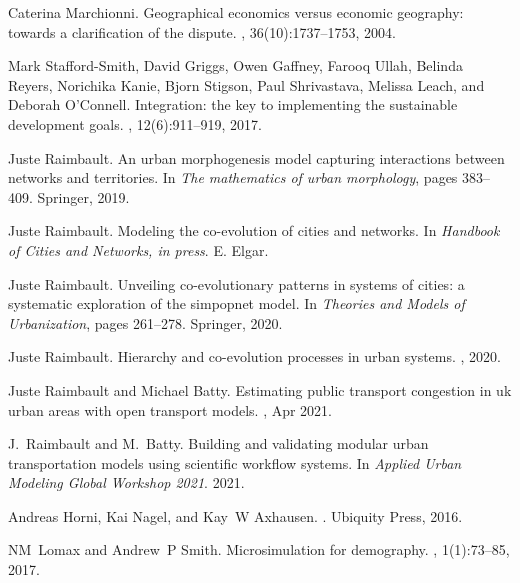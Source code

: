 \begin{thebibliography}{10}
Caterina Marchionni.
\newblock Geographical economics versus economic geography: towards a
  clarification of the dispute.
, 36(10):1737--1753, 2004.

Mark Stafford-Smith, David Griggs, Owen Gaffney, Farooq Ullah, Belinda Reyers,
  Norichika Kanie, Bjorn Stigson, Paul Shrivastava, Melissa Leach, and Deborah
  O’Connell.
\newblock Integration: the key to implementing the sustainable development
  goals.
, 12(6):911--919, 2017.

Juste Raimbault.
\newblock An urban morphogenesis model capturing interactions between networks
  and territories.
\newblock In {\em The mathematics of urban morphology}, pages 383--409.
  Springer, 2019.

Juste Raimbault.
\newblock Modeling the co-evolution of cities and networks.
\newblock In {\em Handbook of Cities and Networks, in press}. E. Elgar.

Juste Raimbault.
\newblock Unveiling co-evolutionary patterns in systems of cities: a systematic
  exploration of the simpopnet model.
\newblock In {\em Theories and Models of Urbanization}, pages 261--278.
  Springer, 2020.

Juste Raimbault.
\newblock Hierarchy and co-evolution processes in urban systems.
, 2020.

Juste Raimbault and Michael Batty.
\newblock Estimating public transport congestion in uk urban areas with open
  transport models.
, Apr 2021.

J.~Raimbault and M.~Batty.
\newblock Building and validating modular urban transportation models using
  scientific workflow systems.
\newblock In {\em Applied Urban Modeling Global Workshop 2021}. 2021.

Andreas Horni, Kai Nagel, and Kay~W Axhausen.
.
\newblock Ubiquity Press, 2016.

NM~Lomax and Andrew~P Smith.
\newblock Microsimulation for demography.
, 1(1):73--85, 2017.


\end{thebibliography}
